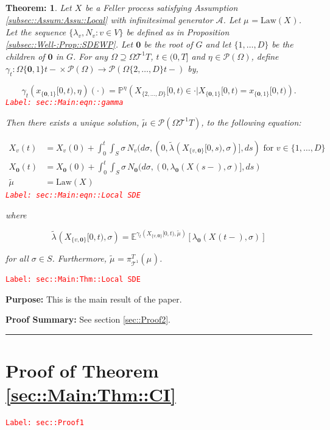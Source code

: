 \documentclass[12pt]{article}
\newcommand{\mb}{\mathbb}
\newcommand{\mc}{\mathcal}
\newcommand{\ra}{\rightarrow}
\newcommand{\te}{\text}
\newcommand{\tr}{\textcolor{red}}
\newcommand{\labe}[1]{\tr{\texttt{Label: #1}}}
\newcommand{\purpose}{\textbf{Purpose: }}
\newcommand{\pfsum}{\textbf{Proof Summary: }}
\newcommand{\lin}{\rule{\linewidth}{0.4 pt}}
\newcommand{\pr}{\mb{P}}							%
\newcommand{\exmu}[2]{\mb{E}^{#1}\left[#2\right]}	%
\newcommand{\pmsr}{\mc{P}}							%
\renewcommand{\root}{\mathbf{0}}				%
\renewcommand{\v}{v}							%
\renewcommand{\S}{S}							%
\newcommand{\s}{\sigma}							%
\newcommand{\T}{T}								%
\renewcommand{\t}{t}							%
\newcommand{\degr}{D}								%
\newcommand{\poiss}[1]{N_{#1}}						%
\newcommand{\IG}{\mc{A}}						%
\newcommand{\law}{\te{Law}}							%
\newcommand{\pup}[1]{^{#1}}							%
\newcommand{\tree}{\mc{T}}							%
\renewcommand{\G}{G}								%
\newcommand{\V}{V}									%
\renewcommand{\tt}{s}								%
\newcommand{\piV}[2]{\pi_{#1}^{#2}}					%
\newcommand{\rxvt}[2]{X_{#1}{(#2)}}					%
\newcommand{\xvts}[2]{x_{#1}{#2}}					%
\newcommand{\rxvts}[2]{X_{#1}{#2}}					%
\newcommand{\m}[3]{\mu_{#2#1}^{#3}}						%
\newcommand{\mmm}[3]{\eta_{#2#1}^{#3}}						%
\newcommand{\cm}{\gamma}							%
\newcommand{\rate}[1]{\lambda_{#1}}					%
\newcommand{\alt}{\widetilde}						%
\newtheorem{thms}{Theorem: }[section]
\begin{document}
\begin{thms}
Let \(\rxvts{}{}\) be a Feller process satisfying Assumption \ref{subsec::Assum:Assu::Local} with infinitesimal generator \(\IG\). Let \(\m{}{}{} = \law(\rxvts{}{})\). Let the sequence \(\{\rate{\v},\poiss{\v}:\v\in \V\}\) be defined as in Proposition \ref{subsec::Well-:Prop::SDEWP}. Let \(\root\) be the root of \(\G\) and let \(\{1,\dots,\degr\}\) be the children of \(\root\) in \(\G\). For any \(\Omega \supseteq\Omega{\tree\pup{1}}{\T}\), \(\t\in (0,\T]\) and \(\mmm{}{}{} \in \pmsr(\Omega)\), define \(\cm_\t:\Omega{\{\root,1\}}{\t-}\times \pmsr(\Omega) \ra \pmsr(\Omega{\{2,\dots,\degr\}}{\t-})\) by,

\begin{equation}
\cm_\t(\xvts{\{\root,1\}}{[0,\t)},\mmm{}{}{})(\cdot) = \pr^{\mmm{}{}{}}\left(\rxvts{\{2,\dots,\degr\}}{[0,\t)} \in \cdot|\rxvts{\{\root,1\}}{[0,\t)} = \xvts{\{\root,1\}}{[0,\t)}\right).
\label{sec::Main:eqn::gamma}
\end{equation}
\labe{sec::Main:eqn::gamma}

Then there exists a unique solution, \(\alt{\m{}{}{}} \in \pmsr(\Omega{\tree\pup{1}}{\T})\), to the following equation:

\begin{align}
\rxvt{\v}{\t} &= \rxvt{\v}{0} + \int_0^\t\int_\S \s\,\poiss{\v}(d\s,(0,\alt{\rate{}}(\rxvts{\{\v,\root\}}{[0,\tt)},\s)],d\tt) \te{ for } \v \in \{1,\dots,\degr\}\nonumber\\
\rxvt{\root}{\t} &= \rxvt{\root}{0} + \int_0^\t\int_\S \s\,\poiss{\root}(d\s,(0,\rate{\root}(\rxvt{}{\tt-},\s)],d\tt)\nonumber\\
\alt{\m{}{}{}} &= \law(\rxvts{}{})
\label{sec::Main:eqn::Local SDE}
\end{align}
\labe{sec::Main:eqn::Local SDE}

where

\[\alt{\rate{}}(\rxvts{\{\v,\root\}}{[0,\t)},\s) = \exmu{\cm_t(\rxvts{\{\v,\root\}}{[0,\t)},\alt{\m{}{}{}})}{\rate{\root}(\rxvt{}{\t-},\s)}\]

for all \(\s\in \S\). Furthermore, \(\alt{\m{}{}{}} = \piV{\tree\pup{1}}{\T}(\m{}{}{})\).
\label{sec::Main:Thm::Local SDE}
\end{thms}
\labe{sec::Main:Thm::Local SDE}

\purpose This is the main result of the paper. 

\pfsum See section \ref{sec::Proof2}.

\lin

\section{Proof of Theorem \ref{sec::Main:Thm::CI}}
\label{sec::Proof1}\labe{sec::Proof1}
\end{document}
